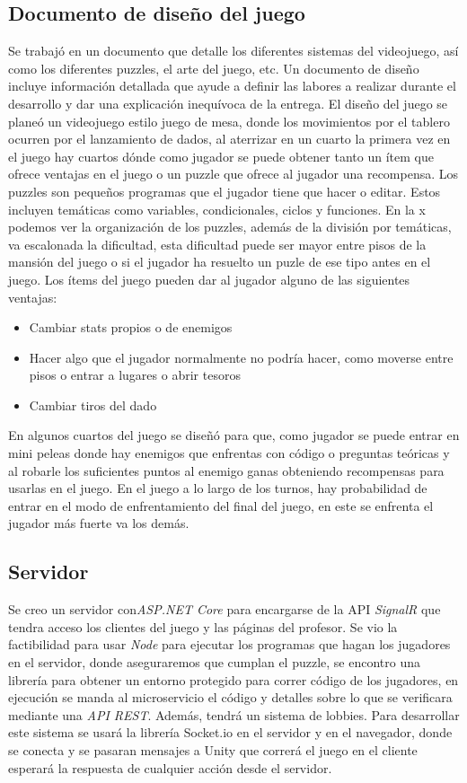 \subsection{Documento de diseño del juego}
Se trabajó en un documento que detalle los diferentes sistemas del videojuego, así como los diferentes puzzles, el arte del juego, etc. Un documento de diseño incluye información detallada que ayude a definir las labores a realizar durante el desarrollo y dar una explicación inequívoca de la entrega. 
El diseño del juego se planeó un videojuego estilo juego de mesa, donde los movimientos por el tablero ocurren por el lanzamiento de dados, al aterrizar en un cuarto la primera vez en el juego hay cuartos dónde como jugador se puede obtener tanto un ítem que ofrece ventajas en el juego o un puzzle que ofrece al jugador una recompensa. 
Los puzzles son pequeños programas que el jugador tiene que hacer o editar. Estos incluyen temáticas como variables, condicionales, ciclos y funciones. En la x podemos ver la organización de los puzzles, además de la división por temáticas, va escalonada la dificultad, esta dificultad puede ser mayor entre pisos de la mansión del juego o si el jugador ha resuelto un puzle de ese tipo antes en el juego.
Los ítems del juego pueden dar al jugador alguno de las siguientes ventajas:
\begin{itemize}
    \item Cambiar stats propios o de enemigos
    \item Hacer algo que el jugador normalmente no podría hacer, como moverse entre pisos o entrar a lugares o abrir tesoros
    \item Cambiar tiros del dado
\end{itemize}

En algunos cuartos del juego se diseñó para que, como jugador se puede entrar en mini peleas donde hay enemigos que enfrentas con código o preguntas teóricas y al robarle los suficientes puntos al enemigo ganas obteniendo recompensas para usarlas en el juego. 
En el juego a lo largo de los turnos, hay probabilidad de entrar en el modo de enfrentamiento del final del juego, en este se enfrenta el jugador más fuerte va los demás.

\subsection{Servidor}
Se creo un servidor con\textit{ASP.NET Core} para encargarse de la API \textit{SignalR} que tendra acceso los clientes del juego y las páginas del profesor. 
Se vio la factibilidad para usar \textit{Node} para ejecutar los programas que hagan los jugadores en el servidor, donde aseguraremos que cumplan el puzzle, se encontro una librería para obtener un entorno protegido para correr código de los jugadores, en ejecución se manda al microservicio el código y detalles sobre lo que se verificara mediante una \textit{API REST}. Además, tendrá un sistema de lobbies.
Para desarrollar este sistema se usará la librería Socket.io en el servidor y en el navegador, donde se conecta y se pasaran mensajes a Unity que correrá el juego en el cliente esperará la respuesta de cualquier acción desde el servidor.

